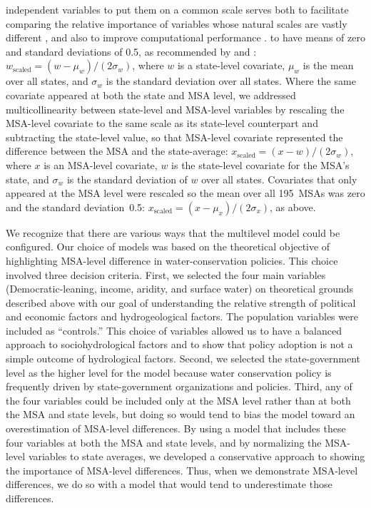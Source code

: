 \documentclass[draft,linenumbers]{agujournal}\usepackage{knitr}
\begin{document}
 independent variables  to put them on a common
scale serves both
to facilitate comparing the relative importance of variables whose natural scales are
vastly different
\citep[pp.~55--57]{gelman:prior:2008,gelman:arm:2007},
and also to improve computational performance \citep{stan:manual:2015}.
 to have means of zero and
standard deviations of 0.5, as recommended by \citet{gelman:prior:2008}
and \citet[pp.~55--57]{gelman:arm:2007}:
$w_{\text{scaled}} = (w - \mu_w) / (2 \sigma_w)$,
where $w$ is a state-level covariate,
$\mu_w$ is the mean over all states,
and $\sigma_w$ is the standard deviation over all states.
Where the same covariate appeared at both the state and
MSA level,
we addressed multicollinearity between state-level and MSA-level
variables by rescaling the MSA-level covariate
to the same scale as its state-level counterpart and
subtracting the state-level value,
so that MSA-level covariate represented the difference between the MSA and
the state-average:
$x_{\text{scaled}} = (x - w) / (2 \sigma_w)$, where $x$ is an MSA-level
covariate, $w$ is the state-level covariate for the MSA's state, and $\sigma_w$
is the standard deviation of $w$ over all states.
Covariates that only appeared at the MSA level were rescaled so
the mean over all 195~MSAs was zero and the standard deviation~0.5:
$x_{\text{scaled}} = (x - \mu_x) / (2 \sigma_x)$, as above.

We recognize that there are various ways that the multilevel model could be
configured.
Our choice of models was based on the theoretical objective of highlighting MSA-level
difference in water-conservation policies. This choice involved three decision criteria.
First, we selected the four main variables (Democratic-leaning, income, aridity, and
surface water) on theoretical grounds described above with our goal of understanding the
relative strength of political and economic factors and hydrogeological factors. The
population variables were included as ``controls.'' This choice of variables allowed us to
have a balanced approach to sociohydrological factors and to show that policy adoption is
not a simple outcome of hydrological factors. Second, we selected the state-government
level as the higher level for the model because water conservation policy is frequently
driven by state-government organizations and policies. Third, any of the four variables
could be included only at the MSA level rather than at both the MSA and state levels, but
doing so would tend to bias the model toward an overestimation of MSA-level differences.
By using a model that includes these four variables at both the MSA and state levels, and
by normalizing the MSA-level variables to state averages, we developed a conservative
approach to showing the importance of MSA-level differences.
Thus, when we demonstrate MSA-level differences, we do so with a model that would tend
to underestimate those differences.
\end{document}
